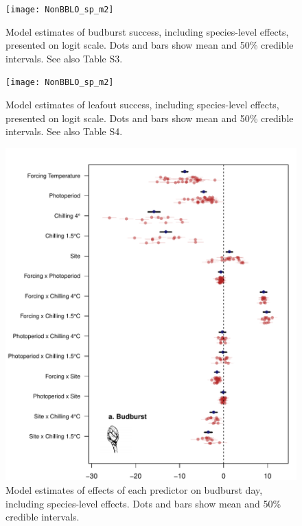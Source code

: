 \documentclass{article}
\begin{document}
\begin{figure}
\label{fig:figS8}
\texttt{[image: NonBBLO\_sp\_m2]} %
\caption{Model estimates of budburst success, including species-level effects, presented on logit scale. Dots and bars show mean and 50\% credible intervals. See also Table S3.}
\end{figure}

\begin{figure}
\label{fig:figS9}
\texttt{[image: NonBBLO\_sp\_m2]}
\caption{Model estimates of leafout success, including species-level effects, presented on logit scale. Dots and bars show mean and 50\% credible intervals. See also Table S4.}
\end{figure}

\begin{figure}
\includegraphics[width=1\textwidth, page=1]{Fig1_bb_lo+sp} %
\caption{Model estimates of effects of each predictor on budburst day, including species-level effects. Dots and bars show mean and 50\% credible intervals.}
\label{fig:figS2}
\end{figure}
\end{document}
